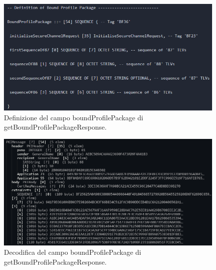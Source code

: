 \documentclass[10pt, oneside]{book}
\begin{document}
\begin{figure}
\includegraphics[width=\linewidth]{def-boundProfilePackage.png}
\caption{Definizione del campo boundProfilePackage di getBoundProfilePackageResponse.}
\label{fig:def-boundProfilePackage}
\end{figure}
\begin{figure}
\includegraphics[width=\linewidth]{decode-boundProfilePackage.png}
\caption{Decodifica del campo boundProfilePackage di getBoundProfilePackageResponse.}
\label{fig:decode-boundProfilePackage}
\end{figure}
\end{document}

